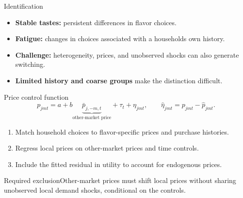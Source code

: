 \documentclass[aspectratio=169,11pt]{beamer}
\begin{document}
\begin{frame}{Identification}
\begin{itemize}
\item \textbf{Stable tastes:} persistent differences in flavor choices.
\item \textbf{Fatigue:} changes in choices associated with a household\textquotesingle s own history.
\item \textbf{Challenge:} heterogeneity, prices, and unobserved shocks can also generate switching.
\item \textbf{Limited history and coarse groups} make the distinction difficult.
\end{itemize}
\end{frame}
\begin{frame}{Price control function}
\[
p_{jmt}=a+b\underbrace{\bar p_{j,-m,t}}_{\text{other-market price}}
+\tau_t+\eta_{jmt},\qquad
\hat\eta_{jmt}=p_{jmt}-\hat p_{jmt}.
\]
\begin{enumerate}
\item Match household choices to flavor-specific prices and purchase histories.
\item Regress local prices on other-market prices and time controls.
\item Include the fitted residual in utility to account for endogenous prices.
\end{enumerate}
\begin{block}{Required exclusion}Other-market prices must shift local prices without sharing unobserved local demand shocks, conditional on the controls.\end{block}
\end{frame}
\end{document}
